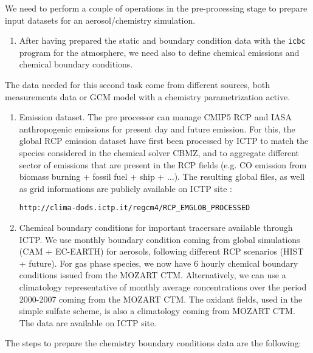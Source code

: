 We need to perform a couple of operations in the pre-processing stage to prepare
input datasets for an aerosol/chemistry simulation.

\begin{enumerate}
  \item After having prepared the static and boundary condition data with the
    \verb=icbc= program for the atmosphere, we need also to define chemical
    emissions and chemical boundary conditions.
\end{enumerate}

The data needed for this second task come from different sources, both
measurements data or GCM model with a chemistry parametrization active.

\begin{enumerate}
  \item Emission dataset. The pre processor can manage CMIP5 RCP and IASA  anthropogenic
    emissions for present day and future emission. For this, the global RCP
    emission dataset have first been processed by ICTP
    to match the species considered in the chemical solver CBMZ, and to
    aggregate different sector of emissions that are present in the RCP fields
    (e.g. CO emission from biomass burning + fossil fuel + ship + $\ldots$).
    The resulting global files, as well as grid informations are publicly
    available on ICTP site :
    \begin{center}
    \verb=http://clima-dods.ictp.it/regcm4/RCP_EMGLOB_PROCESSED=
    \end{center}
    
  \item Chemical boundary conditions for important tracersare available through
    ICTP. We use monthly boundary condition coming from global simulations
    (CAM + EC-EARTH) for aerosols, following different RCP scenarios
    (HIST + future).
    For gas phase species, we now have 6 hourly chemical boundary 
    conditions issued from the MOZART CTM. 
    Alternatively, we can use  a climatology representative
    of monthly average concentrations over the period 2000-2007 coming from
    the MOZART CTM. 
    The oxidant fields, used in the simple
    sulfate scheme, is also a climatology coming from MOZART CTM.
    The data are available on ICTP site.
\end{enumerate}

The steps to prepare the chemistry boundary conditions data are the following:

